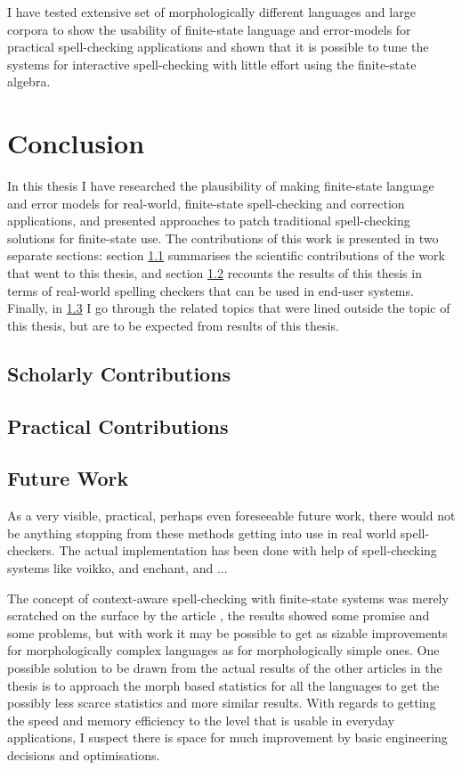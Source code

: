 \documentclass[officiallayout,draft]{unihelcompling}
\begin{document}
I have tested extensive set of morphologically different languages and
large corpora to show the usability of finite-state language and error-models
for practical spell-checking applications and shown that it is possible to tune
the systems for interactive spell-checking with little effort using the
finite-state algebra.

\chapter{Conclusion}
\label{chap:conclusion}

In this thesis I have researched the plausibility of making finite-state
language and error models for real-world, finite-state spell-checking and
correction applications, and presented approaches to patch traditional
spell-checking solutions for finite-state use. The contributions of this work
is presented in two separate sections: section
\ref{sec:scholarly-contributions} summarises the scientific contributions of
the work that went to this thesis, and section
\ref{sec:practical-contributions} recounts the results of this thesis in terms
of real-world spelling checkers that can be used in end-user systems. Finally,
in \ref{sec:future-work} I go through the related topics that were lined
outside the topic of this thesis, but are to be expected from results of this
thesis.

\section{Scholarly Contributions}
\label{sec:scholarly-contributions}

\section{Practical Contributions}
\label{sec:practical-contributions}

\section{Future Work}
\label{sec:future-work}

As a very visible, practical, perhaps even foreseeable future work, there would
not be anything stopping from these methods getting into use in real world
spell-checkers. The actual implementation has been done with help of
spell-checking systems like voikko, and enchant, and ...

The concept of context-aware spell-checking with finite-state systems was
merely scratched on the surface by the article \cite{pirinen2012improving},
the results showed some promise and some problems, but with work it may be
possible to get as sizable improvements for morphologically complex languages
as for morphologically simple ones. One possible solution to be drawn from
the actual results of the other articles in the thesis is to approach the
morph based statistics for all the languages to get the possibly less scarce
statistics and more similar results. With regards to getting the speed and
memory efficiency to the level that is usable in everyday applications, I
suspect there is space for much improvement by basic engineering decisions and
optimisations.
\end{document}
